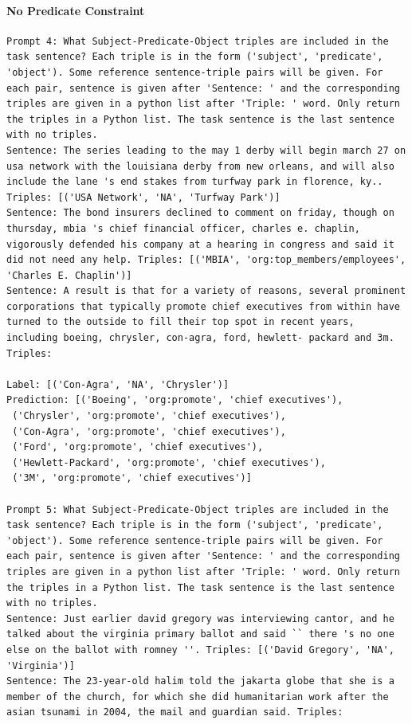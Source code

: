 \documentclass{article}
\begin{document}
\paragraph{No Predicate Constraint}
\begin{lstlisting}
Prompt 4: What Subject-Predicate-Object triples are included in the task sentence? Each triple is in the form ('subject', 'predicate', 'object'). Some reference sentence-triple pairs will be given. For each pair, sentence is given after 'Sentence: ' and the corresponding triples are given in a python list after 'Triple: ' word. Only return the triples in a Python list. The task sentence is the last sentence with no triples.
Sentence: The series leading to the may 1 derby will begin march 27 on usa network with the louisiana derby from new orleans, and will also include the lane 's end stakes from turfway park in florence, ky.. Triples: [('USA Network', 'NA', 'Turfway Park')]
Sentence: The bond insurers declined to comment on friday, though on thursday, mbia 's chief financial officer, charles e. chaplin, vigorously defended his company at a hearing in congress and said it did not need any help. Triples: [('MBIA', 'org:top_members/employees', 'Charles E. Chaplin')]
Sentence: A result is that for a variety of reasons, several prominent corporations that typically promote chief executives from within have turned to the outside to fill their top spot in recent years, including boeing, chrysler, con-agra, ford, hewlett- packard and 3m. Triples:

Label: [('Con-Agra', 'NA', 'Chrysler')]
Prediction: [('Boeing', 'org:promote', 'chief executives'),
 ('Chrysler', 'org:promote', 'chief executives'),
 ('Con-Agra', 'org:promote', 'chief executives'),
 ('Ford', 'org:promote', 'chief executives'),
 ('Hewlett-Packard', 'org:promote', 'chief executives'),
 ('3M', 'org:promote', 'chief executives')]

Prompt 5: What Subject-Predicate-Object triples are included in the task sentence? Each triple is in the form ('subject', 'predicate', 'object'). Some reference sentence-triple pairs will be given. For each pair, sentence is given after 'Sentence: ' and the corresponding triples are given in a python list after 'Triple: ' word. Only return the triples in a Python list. The task sentence is the last sentence with no triples.
Sentence: Just earlier david gregory was interviewing cantor, and he talked about the virginia primary ballot and said `` there 's no one else on the ballot with romney ''. Triples: [('David Gregory', 'NA', 'Virginia')]
Sentence: The 23-year-old halim told the jakarta globe that she is a member of the church, for which she did humanitarian work after the asian tsunami in 2004, the mail and guardian said. Triples:


\end{lstlisting}
\end{document}
